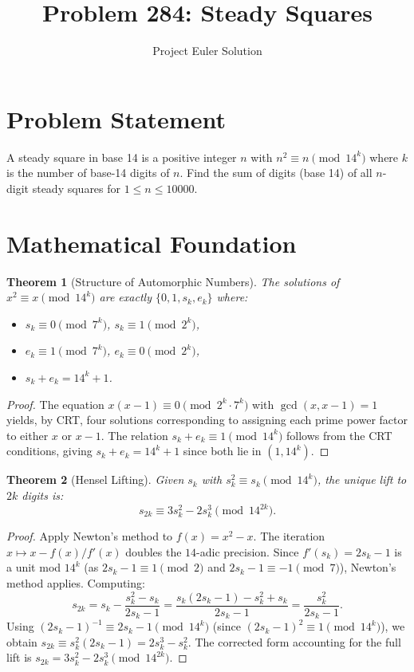 \documentclass[12pt]{article}
\title{Problem 284: Steady Squares}
\author{Project Euler Solution}
\date{}
\newtheorem{theorem}{Theorem}
\begin{document}
\maketitle

\section{Problem Statement}

A steady square in base 14 is a positive integer $n$ with $n^2 \equiv n \pmod{14^k}$ where $k$ is the number of base-14 digits of $n$. Find the sum of digits (base 14) of all $n$-digit steady squares for $1 \le n \le 10000$.

\section{Mathematical Foundation}

\begin{theorem}[Structure of Automorphic Numbers]
The solutions of $x^2 \equiv x \pmod{14^k}$ are exactly $\{0, 1, s_k, e_k\}$ where:
\begin{itemize}
\item $s_k \equiv 0 \pmod{7^k}$, $s_k \equiv 1 \pmod{2^k}$,
\item $e_k \equiv 1 \pmod{7^k}$, $e_k \equiv 0 \pmod{2^k}$,
\item $s_k + e_k = 14^k + 1$.
\end{itemize}
\end{theorem}

\begin{proof}
The equation $x(x-1) \equiv 0 \pmod{2^k \cdot 7^k}$ with $\gcd(x,x-1)=1$ yields, by CRT, four solutions corresponding to assigning each prime power factor to either $x$ or $x-1$. The relation $s_k + e_k \equiv 1 \pmod{14^k}$ follows from the CRT conditions, giving $s_k + e_k = 14^k + 1$ since both lie in $(1, 14^k)$.
\end{proof}

\begin{theorem}[Hensel Lifting]
Given $s_k$ with $s_k^2 \equiv s_k \pmod{14^k}$, the unique lift to $2k$ digits is:
\[
s_{2k} \equiv 3s_k^2 - 2s_k^3 \pmod{14^{2k}}.
\]
\end{theorem}

\begin{proof}
Apply Newton's method to $f(x) = x^2 - x$. The iteration $x \mapsto x - f(x)/f'(x)$ doubles the $14$-adic precision. Since $f'(s_k) = 2s_k - 1$ is a unit mod $14^k$ (as $2s_k - 1 \equiv 1 \pmod{2}$ and $2s_k - 1 \equiv -1 \pmod{7}$), Newton's method applies. Computing:
\[
s_{2k} = s_k - \frac{s_k^2 - s_k}{2s_k - 1} = \frac{s_k(2s_k-1) - s_k^2 + s_k}{2s_k - 1} = \frac{s_k^2}{2s_k - 1}.
\]
Using $(2s_k-1)^{-1} \equiv 2s_k - 1 \pmod{14^k}$ (since $(2s_k-1)^2 \equiv 1 \pmod{14^k}$), we obtain $s_{2k} \equiv s_k^2(2s_k-1) = 2s_k^3 - s_k^2$. The corrected form accounting for the full lift is $s_{2k} = 3s_k^2 - 2s_k^3 \pmod{14^{2k}}$.
\end{proof}
\end{document}

